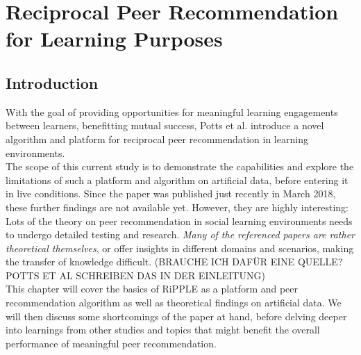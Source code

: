 \documentclass[nochapterpage,bigchapter,linedtoc,longdoc,colorback,accentcolor=tud3b]{tudreport}
\begin{document}
\chapter{Reciprocal Peer Recommendation for Learning Purposes}
\section{Introduction}
With the goal of providing opportunities for meaningful learning engagements between learners, benefitting mutual success, Potts et al. introduce a novel algorithm and platform for reciprocal peer recommendation in learning environments.\\
The scope of this current study is to demonstrate the capabilities and explore the limitations of such a platform and algorithm on artificial data, before entering it in live conditions. Since the paper was published just recently in March 2018, these further findings are not available yet. However, they are highly interesting: Lots of the theory on peer recommendation in social learning environments needs to undergo detailed testing and research. \textit{Many of the referenced papers are rather theoretical themselves}, or offer insights in different domains and scenarios, making the transfer of knowledge difficult. (BRAUCHE ICH DAFÜR EINE QUELLE? POTTS ET AL SCHREIBEN DAS IN DER EINLEITUNG)\\
This chapter will cover the basics of RiPPLE as a platform and peer recommendation algorithm as well as theoretical findings on artificial data. We will then discuss some shortcomings of the paper at hand, before delving deeper into learnings from other studies and topics that might benefit the overall performance of meaningful peer recommendation.\\
\end{document}
